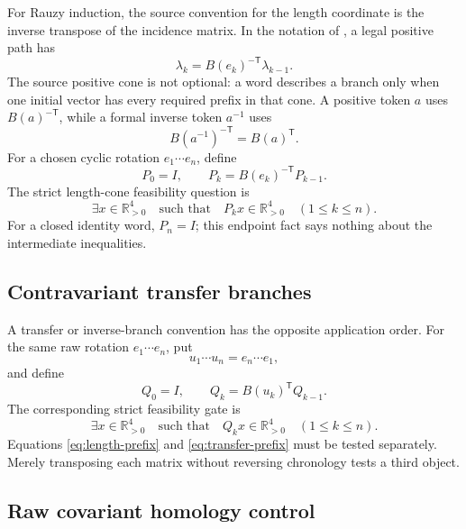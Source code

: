 For Rauzy induction, the source convention for the length coordinate is the
inverse transpose of the incidence matrix.  In the notation of
\citet[Sections~3.1.3--3.3]{AvilaGouezelYoccoz2006}, a legal positive path has
\begin{equation}
  \lambda_k=B(e_k)^{-\mathsf T}\lambda_{k-1}.
  \label{eq:length-action}
\end{equation}
The source positive cone is not optional: a word describes a branch only when
one initial vector has every required prefix in that cone.  A positive token
$a$ uses $B(a)^{-\mathsf T}$, while a formal inverse token $a^{-1}$ uses
\[
B(a^{-1})^{-\mathsf T}=B(a)^{\mathsf T}.
\]
For a chosen cyclic rotation $e_1\cdots e_n$, define
\begin{equation}
 P_0=I,\qquad P_k=B(e_k)^{-\mathsf T}P_{k-1}.
 \label{eq:length-prefix}
\end{equation}
The strict length-cone feasibility question is
\begin{equation}
 \exists x\in\mathbb R_{>0}^4
 \quad\text{such that}\quad
 P_kx\in\mathbb R_{>0}^4\quad(1\leq k\leq n).
 \label{eq:length-feasibility}
\end{equation}
For a closed identity word, $P_n=I$; this endpoint fact says nothing about the
intermediate inequalities.

\subsection{Contravariant transfer branches}

A transfer or inverse-branch convention has the opposite application order.
For the same raw rotation $e_1\cdots e_n$, put
\[
u_1\cdots u_n=e_n\cdots e_1,
\]
and define
\begin{equation}
 Q_0=I,\qquad Q_k=B(u_k)^{\mathsf T}Q_{k-1}.
 \label{eq:transfer-prefix}
\end{equation}
The corresponding strict feasibility gate is
\begin{equation}
 \exists x\in\mathbb R_{>0}^4
 \quad\text{such that}\quad
 Q_kx\in\mathbb R_{>0}^4\quad(1\leq k\leq n).
 \label{eq:transfer-feasibility}
\end{equation}
Equations \eqref{eq:length-prefix} and \eqref{eq:transfer-prefix} must be
tested separately.  Merely transposing each matrix without reversing
chronology tests a third object.

\subsection{Raw covariant homology control}

